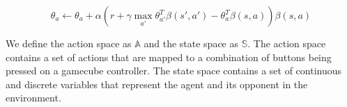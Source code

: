 \begin{equation}
	\theta_a \leftarrow \theta_a+\alpha(r + \gamma \max_{a'} \theta_{a'}^T\beta(s',a') -  \theta_{a}^T\beta(s,a))\beta(s,a)
\end{equation}

We define the action space as $\mathbb{A}$ and the state space as $\mathbb{S}$. The action space contains a set of actions that are mapped to a combination of buttons being pressed on a gamecube controller. The state space contains a set of continuous and discrete variables that represent the agent and its opponent in the environment.



